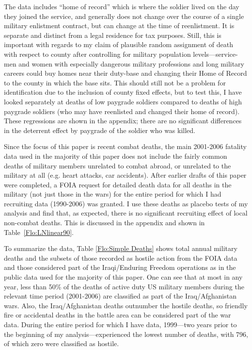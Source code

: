 \documentclass[12pt] {article}
\begin{document}
The data includes {}``home of record'' which is where the soldier lived on the day they joined the service, and generally does not change over the course of a single military enlistment contract, but can change at the time of reenlistment. It is separate and distinct from a legal residence for tax purposes. Still, this is important with regards to my claim of plausible random assignment of death with respect to county after controlling for military population levels---service-men and women with especially dangerous military professions and long military careers could buy homes near their duty-base and changing their Home of Record to the county in which the base sits. This should still not be a problem for identification due to the inclusion of county fixed effects, but to test this, I have looked separately at deaths of low paygrade soldiers compared to deaths of high paygrade soldiers (who may have reenlisted and changed their home of record). These regressions are shown in the appendix; there are no significant differences in the deterrent effect by paygrade of the soldier who was killed. 

Since the focus of this paper is recent combat deaths, the main 2001-2006 fatality data used in the majority of this paper does not include the fairly common deaths of military members unrelated to combat abroad, or unrelated to the military at all (e.g. heart attacks, car accidents).  After earlier drafts of this paper were completed, a FOIA request for detailed death data for all deaths in the military (not just those in the wars) for the entire period for which I had recruiting data (1990-2006) was granted. I use these deaths as placebo tests of my analysis and find that, as expected, there is no significant recruiting effect of local non-combat deaths. This is discussed in the appendix and shown in Table~\ref{Flo:LNlinear90}.

To summarize the data, Table \ref{Flo:Simple Deaths} shows total annual military deaths and the subsets of those recorded as hostile action from the FOIA data and those considered part of the Iraqi/Enduring Freedom operations as in the public data used for the majority of this paper. One can see that at most in any year, less than 50\% of the deaths of active duty US military members during the relevant time period (2001-2006) are classified as part of the Iraq/Afghanistan wars. Also, the Iraq/Afghanistan deaths outnumber the hostile deaths, so friendly fire or accidental deaths in the battle area can be considered part of the war data. During the entire period for which I have data, 1999---two years prior to the beginning of my analysis---experienced the lowest number of deaths, with 796, of which zero were classified as hostile. 
\end{document}

